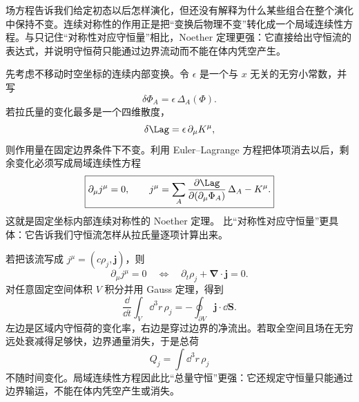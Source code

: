 场方程告诉我们给定初态以后怎样演化，但还没有解释为什么某些组合在整个演化中保持不变。连续对称性的作用正是把“变换后物理不变”转化成一个局域连续性方程。与只记住“对称性对应守恒量”相比，Noether 定理更强：它直接给出守恒流的表达式，并说明守恒荷只能通过边界流动而不能在体内凭空产生。

先考虑不移动时空坐标的连续内部变换。令 $\epsilon$ 是一个与 $x$ 无关的无穷小常数，并写
\begin{equation*}
 \delta\Phi_A=\epsilon\,\Delta_A(\Phi).
\end{equation*}
若拉氏量的变化最多是一个四维散度，
\begin{equation}
 \delta\Lag=\epsilon\,\partial_\mu K^\mu,
 \label{eq:noether-total-derivative-dp61}
\end{equation}
则作用量在固定边界条件下不变。利用 Euler--Lagrange 方程把体项消去以后，剩余变化必须写成局域连续性方程
\begin{equation}
 \boxed{
 \partial_\mu j^\mu=0,
 \qquad
 j^\mu
 =\sum_A
 \frac{\partial\Lag}{\partial(\partial_\mu\Phi_A)}\,\Delta_A
 -K^\mu.}
 \label{eq:noether-current-general-dp61}
\end{equation}
这就是固定坐标内部连续对称性的 Noether 定理。 比“对称性对应守恒量”更具体：它告诉我们守恒流怎样从拉氏量逐项计算出来。

若把该流写成 $j^\mu=(c\rho_j,\mathbf j)$，则
\begin{equation*}
 \partial_\mu j^\mu=0
 \quad\Longleftrightarrow\quad
 \partial_t\rho_j+\boldsymbol\nabla\!\cdot\mathbf j=0.
\end{equation*}
对任意固定空间体积 $V$ 积分并用 Gauss 定理，得到
\begin{equation}
 \boxed{
 \frac{\dd}{\dd t}\int_V\dd^3 r\,\rho_j
 =-\oint_{\partial V}\mathbf j\cdot\dd\mathbf S.}
 \label{eq:noether-flux-balance-dp61}
\end{equation}
左边是区域内守恒荷的变化率，右边是穿过边界的净流出。若取全空间且场在无穷远处衰减得足够快，边界通量消失，于是总荷
\begin{equation*}
 Q_j=\int\dd^3 r\,\rho_j
\end{equation*}
不随时间变化。局域连续性方程因此比“总量守恒”更强：它还规定守恒量只能通过边界输运，不能在体内凭空产生或消失。

